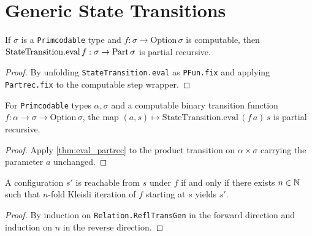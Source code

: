 
\chapter{Generic State Transitions}

\begin{theorem}
  \label{thm:eval_partrec}
  \leanok
  If $\sigma$ is a \texttt{Primcodable} type and $f : \sigma \to \mathrm{Option}\,\sigma$ is computable, then $\mathrm{StateTransition.eval}\,f : \sigma \to \mathrm{Part}\,\sigma$ is partial recursive.
\end{theorem}
\begin{proof}
  \leanok
  By unfolding \texttt{StateTransition.eval} as \texttt{PFun.fix} and applying \texttt{Partrec.fix} to the computable step wrapper.
\end{proof}

\begin{theorem}
  \label{thm:eval_partrec2}
  \leanok
  For \texttt{Primcodable} types $\alpha, \sigma$ and a computable binary transition function $f : \alpha \to \sigma \to \mathrm{Option}\,\sigma$, the map $(a, s) \mapsto \mathrm{StateTransition.eval}\,(f\,a)\,s$ is partial recursive.
\end{theorem}
\begin{proof}
  \leanok
  Apply \ref{thm:eval_partrec} to the product transition on $\alpha \times \sigma$ carrying the parameter $a$ unchanged.
\end{proof}

\begin{lemma}
  \label{lem:reaches_iff_exists_iterate}
  \leanok
  A configuration $s'$ is reachable from $s$ under $f$ if and only if there exists $n \in \mathbb{N}$ such that $n$-fold Kleisli iteration of $f$ starting at $s$ yields $s'$.
\end{lemma}
\begin{proof}
  \leanok
  By induction on \texttt{Relation.ReflTransGen} in the forward direction and induction on $n$ in the reverse direction.
\end{proof}


